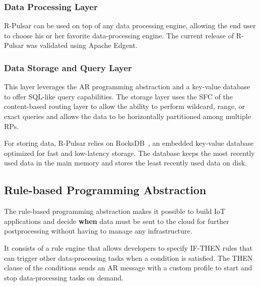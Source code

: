 \subsubsection{Data Processing Layer}

R-Pulsar can be used on top of any data processing engine, allowing the end user to choose his or her favorite data-processing engine. The current release of R-Pulsar was validated using Apache Edgent. 

\subsubsection{Data Storage and Query Layer}

This layer leverages the AR programming abstraction and a key-value database to offer SQL-like query capabilities. The storage layer uses the SFC of the content-based routing layer to allow the ability to perform wildcard, range, or exact queries and allows the data to be horizontally partitioned among multiple RPs. 

For storing data, R-Pulsar relies on RocksDB~\cite{rocks}, an embedded key-value database optimized for fast and low-latency storage. The database keeps the most recently used data in the main memory and stores the least recently used data on disk.

\subsection{Rule-based Programming Abstraction}\label{sec:programming-data}
The rule-based programming abstraction makes it possible to build IoT applications and decide \textbf{when} data must be sent to the cloud for further postprocessing without having to manage any infrastructure.

It consists of a rule engine that allows developers to specify IF-THEN rules that can trigger other data-processing tasks when a condition is satisfied. The THEN clause of the conditions sends an AR message with a custom profile to start and stop data-processing tasks on demand. %

